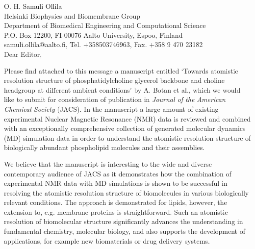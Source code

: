 \documentclass[12pt]{letter}
\begin{document}
\reversemarginpar
\pagestyle{empty}
\noindent O. H. Samuli Ollila \\
\noindent Helsinki Biophysics and Biomembrane Group\\
\noindent Department of Biomedical Engineering and Computational Science\\
\noindent P.O. Box 12200, FI-00076 Aalto University, Espoo, Finland\\
\noindent samuli.ollila@aalto.fi, Tel. +358503746963, Fax. +358 9 470 23182 \\


%
%

Dear Editor,

Please find attached to this message a manuscript entitled `Towards atomistic resolution structure of phosphatidylcholine 
glycerol backbone and choline headgroup at different ambient conditions' by A. Botan et al., which we would like to submit 
for consideration of publication in \textit{Journal of the American Chemical Society} (JACS). In the manuscript a large amount of
existing experimental Nuclear Magnetic Resonance (NMR) data is reviewed and combined with an exceptionally comprehensive 
collection of generated molecular dynamics (MD) simulation data in order to understand the atomistic resolution structure 
of biologically abundant phospholipid molecules and their assemblies.

We believe that the manuscript is interesting to the wide and diverse contemporary audience of
JACS as it demonstrates how the combination of experimental NMR data with MD simulations is shown 
to be successful in resolving the atomistic resolution structure of biomolecules in various biologically 
relevant conditions. The approach is demonstrated for lipids, however, the extension to, e.g. membrane 
proteins is straightforward. Such an atomistic resolution of biomolecular structure significantly advances 
the understanding in fundamental chemistry, molecular biology, and also supports the development of applications, 
for example new biomaterials or drug delivery systems.
\end{document}
